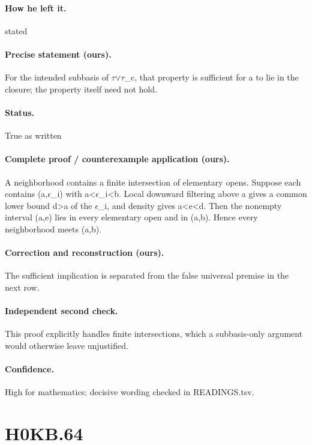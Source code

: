 \paragraph{How he left it.} stated

\paragraph{Precise statement (ours).} For the intended subbasis of \ensuremath{\tau}\ensuremath{\vee}\ensuremath{\tau}\_c, that property is sufficient for a to lie in the closure; the property itself need not hold.

\paragraph{Status.} True as written

\paragraph{Complete proof / counterexample application (ours).} A neighborhood contains a finite intersection of elementary opens. Suppose each contains (a,\ensuremath{\epsilon}\_i) with a<\ensuremath{\epsilon}\_i<b. Local downward filtering above a gives a common lower bound d>a of the \ensuremath{\epsilon}\_i, and density gives a<e<d. Then the nonempty interval (a,e) lies in every elementary open and in (a,b). Hence every neighborhood meets (a,b).

\paragraph{Correction and reconstruction (ours).} The sufficient implication is separated from the false universal premise in the next row.

\paragraph{Independent second check.} This proof explicitly handles finite intersections, which a subbasis-only argument would otherwise leave unjustified.

\paragraph{Confidence.} High for mathematics; decisive wording checked in READINGS.tsv.

\section*{H0KB.64}\label{statement:H0KB.64}
